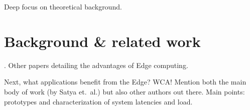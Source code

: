 Deep focus on theoretical background.

\section{Background \& related work}
\textcite{Satya2009Case}.
Other papers detailing the advantages of Edge computing.

Next, what applications benefit from the Edge?
\gls{WCA}! Mention both the main body of work (by Satya et.\ al.) but also other authors out there.
Main points: prototypes and characterization of system latencies and load.
